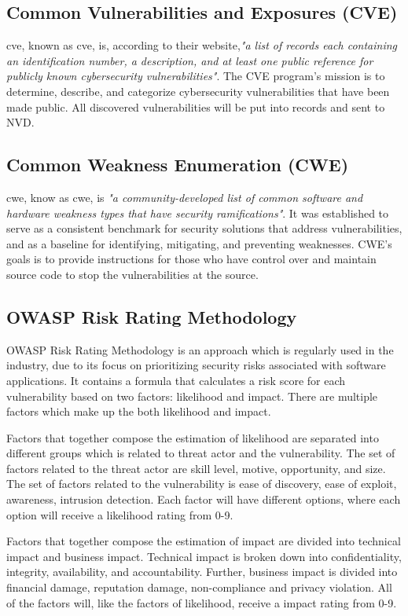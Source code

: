 \subsection{Common Vulnerabilities and Exposures (CVE)}
\acrlong{cve}, known as \acrshort{cve}, is, according to their website,\textit{"a list of records each containing an identification number, a description, and at least one public reference for publicly known cybersecurity vulnerabilities"}\cite{CVE}. The CVE program's mission is to determine, describe, and categorize cybersecurity vulnerabilities that have been made public. All discovered vulnerabilities will be put into records and sent to NVD.\cite{CVE}

\subsection{Common Weakness Enumeration (CWE)}
\acrlong{cwe}, know as \acrshort{cwe}, is \textit{"a community-developed list of common software and hardware weakness types that have security ramifications"}\cite{CWE}. It was established to serve as a consistent benchmark for security solutions that address vulnerabilities, and as a baseline for identifying, mitigating, and preventing weaknesses. CWE's goals is to provide instructions for those who have control over and maintain source code to stop the vulnerabilities at the source.\cite{CWE} 

\subsection{OWASP Risk Rating Methodology}
OWASP Risk Rating Methodology is an approach which is regularly used in the industry, due to its focus on prioritizing security risks associated with software applications. It contains a formula  that calculates a risk score for each vulnerability based on two factors: likelihood and impact. There are multiple factors which make up the both likelihood and impact. 

Factors that together compose the estimation of likelihood are separated into different groups which is related to threat actor and the vulnerability. The set of factors related to the threat actor are skill level, motive, opportunity, and size. The set of factors related to the vulnerability is ease of discovery, ease of exploit, awareness, intrusion detection. Each factor will have different options, where each option will receive a likelihood rating from 0-9. 

Factors that together compose the estimation of impact are divided into technical impact and business impact. Technical impact is broken down into confidentiality, integrity, availability, and accountability. Further, business impact is divided into financial damage, reputation damage, non-compliance and privacy violation. All of the factors will, like the factors of likelihood, receive a impact rating from 0-9. 

